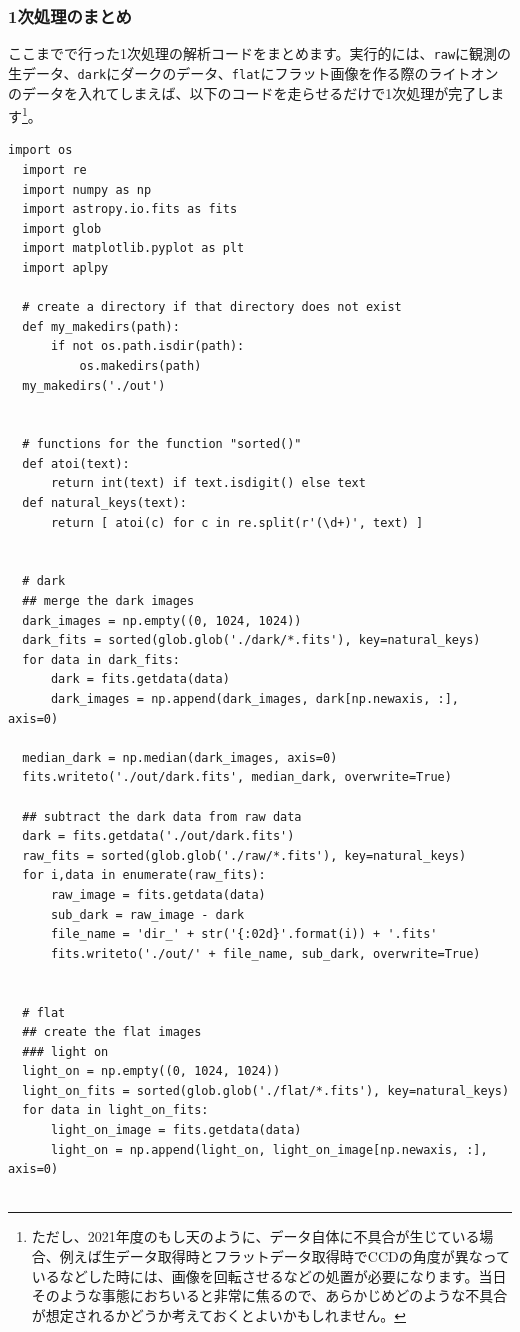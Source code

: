 \subsubsection{1次処理のまとめ}
ここまでで行った1次処理の解析コードをまとめます。実行的には、\texttt{raw}に観測の生データ、\texttt{dark}にダークのデータ、\texttt{flat}にフラット画像を作る際のライトオンのデータを入れてしまえば、以下のコードを走らせるだけで1次処理が完了します\footnote{ただし、2021年度のもし天のように、データ自体に不具合が生じている場合、例えば生データ取得時とフラットデータ取得時でCCDの角度が異なっているなどした時には、画像を回転させるなどの処置が必要になります。当日そのような事態におちいると非常に焦るので、あらかじめどのような不具合が想定されるかどうか考えておくとよいかもしれません。}。
\begin{lstlisting}[caption=1次処理のまとめ,label=code:itizisyori]
  import os
  import re
  import numpy as np
  import astropy.io.fits as fits
  import glob
  import matplotlib.pyplot as plt
  import aplpy

  # create a directory if that directory does not exist
  def my_makedirs(path):
      if not os.path.isdir(path):
          os.makedirs(path)
  my_makedirs('./out')


  # functions for the function "sorted()"
  def atoi(text):
      return int(text) if text.isdigit() else text
  def natural_keys(text):
      return [ atoi(c) for c in re.split(r'(\d+)', text) ]


  # dark
  ## merge the dark images
  dark_images = np.empty((0, 1024, 1024)) 
  dark_fits = sorted(glob.glob('./dark/*.fits'), key=natural_keys)
  for data in dark_fits:
      dark = fits.getdata(data)
      dark_images = np.append(dark_images, dark[np.newaxis, :], axis=0)

  median_dark = np.median(dark_images, axis=0)
  fits.writeto('./out/dark.fits', median_dark, overwrite=True)

  ## subtract the dark data from raw data
  dark = fits.getdata('./out/dark.fits')
  raw_fits = sorted(glob.glob('./raw/*.fits'), key=natural_keys)
  for i,data in enumerate(raw_fits):
      raw_image = fits.getdata(data)
      sub_dark = raw_image - dark
      file_name = 'dir_' + str('{:02d}'.format(i)) + '.fits'
      fits.writeto('./out/' + file_name, sub_dark, overwrite=True)


  # flat
  ## create the flat images
  ### light on
  light_on = np.empty((0, 1024, 1024))
  light_on_fits = sorted(glob.glob('./flat/*.fits'), key=natural_keys)
  for data in light_on_fits:
      light_on_image = fits.getdata(data)
      light_on = np.append(light_on, light_on_image[np.newaxis, :], axis=0)


\end{lstlisting}

